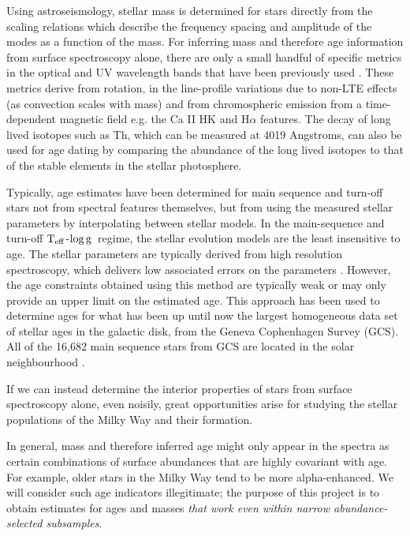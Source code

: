 \documentclass[12pt, preprint]{aastex}
\newcommand{\teff}{\mbox{$\rm T_{eff}$}}
\newcommand{\logg}{\mbox{$\rm \log g$}}
\begin{document}
Using astroseismology, stellar mass is determined for stars directly from the scaling relations which describe the frequency spacing and amplitude of the modes as a function of the mass. For inferring mass and therefore age information from surface spectroscopy alone, there are only a small handful of specific metrics in the optical and UV wavelength bands that have been previously used  \citep[see][and references therein]{soderblom2010}. These metrics derive from rotation, in the line-profile variations due to non-LTE effects (as convection scales with mass) and from chromospheric emission from a time-dependent magnetic field e.g. the Ca II HK and H$\alpha$ features. The decay of long lived isotopes such as Th, which can be measured at 4019 Angstroms, can also be used for age dating by comparing the abundance of the long lived isotopes to that of the stable elements in the stellar photosphere. 


Typically, age estimates have been determined for main sequence and turn-off stars not from spectral features themselves, but from using the measured stellar parameters by interpolating between stellar models. In the main-sequence and turn-off \teff-\logg\ regime, the stellar evolution models are the least insensitive to age. The stellar parameters are typically derived from high resolution spectroscopy, which delivers low associated errors on the parameters \citep[e.g.][]{Bensby2013, Casagrande2011, haywood2013}.   However, the age constraints obtained using this method are typically weak or may only provide an upper limit on the estimated age.  This approach has been used to determine ages for what has been up until now the largest homogeneous data set of stellar ages in the galactic disk, from the Geneva Cophenhagen Survey (GCS). All of the 16,682 main sequence stars from GCS are located in the solar neighbourhood \citep{nordstrom2004short}.

If we can instead determine the interior properties of stars from surface
spectroscopy alone, even noisily, great opportunities arise for
studying the stellar populations of the Milky Way and their formation. 

In general, mass and therefore inferred age might only appear in the spectra as
certain combinations of surface abundances that are highly covariant
with age.  For example, older stars in the Milky Way tend to be more
alpha-enhanced.  We will consider such age indicators illegitimate;
the purpose of this project is to obtain estimates for ages and masses \emph{that work even within narrow abundance-selected subsamples}.
\end{document}
